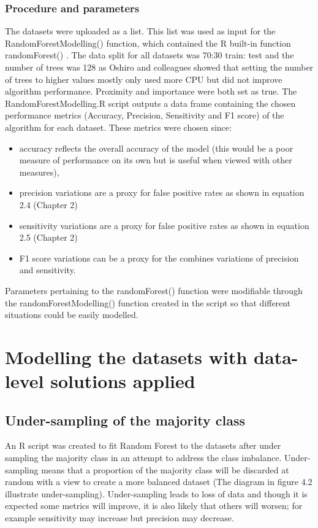 \subsubsection{Procedure and parameters}
The datasets were uploaded as a list. This list was used as input for the RandomForestModelling() function, which contained the R built-in function randomForest() \citep{Anonymous:eo5jDFnb}. 
The data split for all datasets was 70:30 train: test and the number of trees was 128 as Oshiro and colleagues showed that setting the number of trees to higher values mostly only used more CPU but did not improve algorithm performance\citep{MayumiOshiro:ve}. Proximity and importance were both set as true.\newline
The RandomForestModelling.R script outputs a data frame containing the chosen performance metrics (Accuracy, Precision, Sensitivity and F1 score) of the algorithm for each dataset.\newline
These metrics were chosen since:
\begin{itemize}
    \item accuracy reflects the overall accuracy of the model (this would be a poor measure of performance on its own but is useful when viewed with other measures), 
    \item precision variations are a proxy for false positive rates as shown in equation 2.4 (Chapter 2)
    \item sensitivity variations are a proxy for false positive rates as shown in equation 2.5 (Chapter 2)
    \item F1 score variations can be a proxy for the combines variations of precision and sensitivity.
\end{itemize}
Parameters pertaining to the randomForest() function were modifiable through the randomForestModelling() function created in the script so that different situations could be easily modelled.\newline

\section{Modelling the datasets with data-level solutions applied}
\subsection{Under-sampling of the majority class}
An R script was created to fit Random Forest to the datasets after under sampling the majority class in an attempt to address the class imbalance.\newline
Under-sampling means that a proportion of the majority class will be discarded at random with a view to create a more balanced dataset (The diagram in figure 4.2 illustrate under-sampling).\newline
Under-sampling leads to loss of data and though it is expected some metrics will improve, it is also likely that others will worsen; for example sensitivity may increase but precision may decrease.\newline

